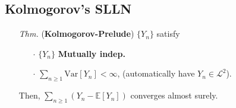 \documentclass[a4paper,12pt,twoside]{book}
\begin{document}
\subsection{Kolmogorov's SLLN}
\begin{itemize}
	\item[\textit{Thm.}] (\textbf{Kolmogorov-Prelude}) $\{Y_n\}$ satisfy
	\begin{itemize}
		\item[$\cdot$] $\{Y_n\}$ \textbf{Mutually indep.}
		\item[$\cdot$] $\sum_{n\geq1}\mathrm{Var}\left[Y_n\right]<\infty$, (automatically have $Y_n \in \mathcal{L}^2$).
	\end{itemize}
	Then, $\sum_{n\geq 1}(Y_n - \mathbb{E}\left[Y_n\right])$ converges almost surely.


\end{itemize}
\end{document}
